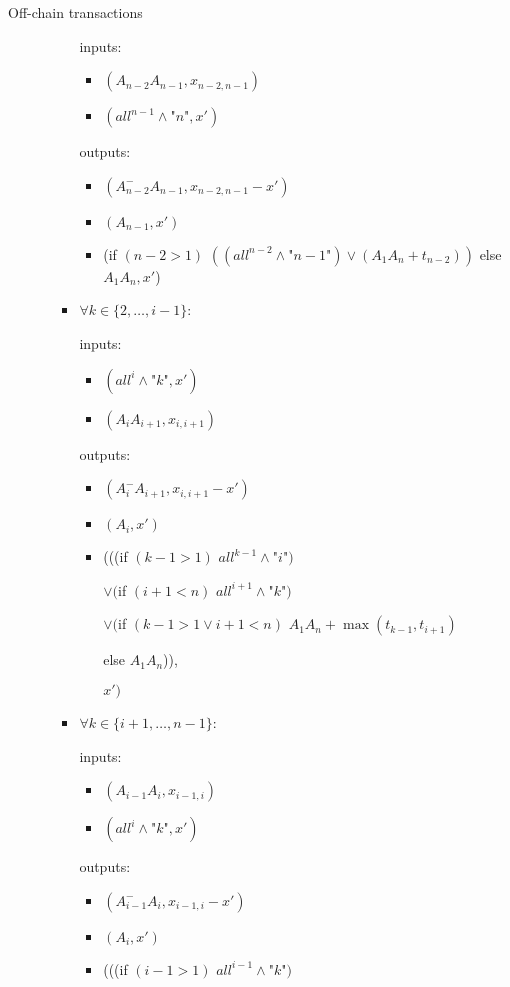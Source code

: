 \begin{notitlebox}{Off-chain transactions}
\begin{itemize}
\begin{itemize}
\begin{itemize}
        inputs:
        \begin{itemize}
          \item $(A_{n-2} A_{n-1}, x_{n-2,n-1})$
          \item $(\mathit{all}^{n-1} \wedge \texttt{"}n\texttt{"}, x')$
        \end{itemize}
        outputs:
        \begin{itemize}
          \item $(A_{n-2}^- A_{n-1}, x_{n-2,n-1} - x')$
          \item $(A_{n-1}, x')$
          \item (if $(n-2 > 1)$ $((\mathit{all}^{n-2} \wedge
          \texttt{"}n-1\texttt{"})
          \vee (A_1 A_n + t_{n-2}))$ else $A_1 A_n, x'$)
        \end{itemize}
        \item $\forall k \in \{2, \dots, i-1\}$:

        inputs:
        \begin{itemize}
          \item $(\mathit{all}^i \wedge \texttt{"}k\texttt{"}, x')$
          \item $(A_i A_{i+1}, x_{i,i+1})$
        \end{itemize}
        outputs:
        \begin{itemize}
          \item $(A_i^- A_{i+1}, x_{i,i+1} - x')$
          \item $(A_i, x')$
          \item (((if $(k-1 > 1)$ $\mathit{all}^{k-1} \wedge
          \texttt{"}i\texttt{"})$

          $\vee ($if $(i+1 < n)$ $\mathit{all}^{i+1} \wedge
          \texttt{"}k\texttt{"})$

          $\vee ($if $(k-1 > 1 \vee i+1 < n)$ $A_1 A_n+\max{(t_{k-1}, t_{i+1})}$

          \:\:\: else $A_1 A_n$)),

          $x')$
        \end{itemize}
        \item $\forall k \in \{i+1, \dots, n-1\}$:

        inputs:
        \begin{itemize}
          \item $(A_{i-1} A_i, x_{i-1,i})$
          \item $(\mathit{all}^i \wedge \texttt{"}k\texttt{"}, x')$
        \end{itemize}
        outputs:
        \begin{itemize}
          \item $(A_{i-1}^- A_i, x_{i-1,i} - x')$
          \item $(A_i, x')$
          \item (((if $(i-1 > 1)$ $\mathit{all}^{i-1} \wedge \texttt{"}k\texttt{"})$


\end{itemize}
\end{itemize}
\end{itemize}
\end{itemize}
\end{notitlebox}
